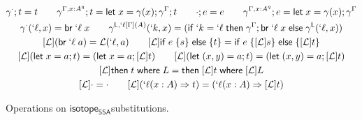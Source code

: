 \documentclass[acmsmall,screen,review]{acmart}
\newcommand{\mc}[1]{\ensuremath{\mathcal{#1}}}
\newcommand{\ms}[1]{\ensuremath{\mathsf{#1}}}
\newcommand{\lbl}[1]{{`#1}}
\newcommand{\lto}{\Rightarrow}
\newcommand{\letstmt}[3]{\ensuremath{\ms{let}\;#1 = #2; #3}}
\newcommand{\brb}[2]{\ms{br}\;#1\;#2}
\newcommand{\lbrb}[2]{\brb{\lbl{#1}}{#2}}
\newcommand{\ite}[3]{\ms{if}\;#1\;\{#2\}\;\ms{else}\;\{#3\}}
\newcommand{\ewhere}[2]{\ms{then}\;#1\;\ms{where}\;#2}
\newcommand{\wbranch}[3]{#1(#2) \lto #3}
\newcommand{\lwbranch}[3]{\wbranch{\lbl{#1}}{#2}{#3}}
\newcommand{\lhyp}[3]{#1[#2](#3)}
\newcommand{\llhyp}[3]{\lhyp{\lbl{#1}}{#2}{#3}}
\newcommand{\exprletsubst}[2]{{#1};{#2}}
\newcommand{\stmtletsubst}[2]{{#1};{#2}}
\newcommand{\substctx}[2]{{#1}^{#2}}
\newcommand{\substlbs}[2]{{#1}^{#2}}
\newcommand{\restrictsubst}[2]{{#1}_{#2}}
\newcommand{\isotopessa}{\ms{isotope_{SSA}}}
\begin{document}
\begin{figure}
  \begin{gather*}
    \stmtletsubst{\substctx{\gamma}{\cdot}}{t} = t
    \qquad
    \stmtletsubst{\substctx{\gamma}{\Gamma, x: A^q}}{t} 
      = \letstmt{x}{\gamma(x)}{\stmtletsubst{\substctx{\gamma}{\Gamma}}{t}}
    \qquad
    \exprletsubst{\cdot}{e} = e
    \qquad
    \exprletsubst{\substctx{\gamma}{\Gamma, x: A^q}}{e} 
      = \letstmt{x}{\gamma(x)}{\substctx{\gamma}{\Gamma}}
    \\
    \substlbs{\gamma}{\cdot}(\lbl{\ell}, x) = \lbrb{\ell}{x}
    \qquad
    \substlbs{\gamma}{\ms{L}, \llhyp{\ell}{\Gamma}{A}}(\lbl{k}, x)
      = 
      (\ms{if}\; \lbl{k} = \lbl{\ell} 
      \;\ms{then}\;\stmtletsubst{\substctx{\gamma}{\Gamma}}{\lbrb{\ell}{x}}
      \;\ms{else}\;\substlbs{\gamma}{\ms{L}}(\lbl{\ell}, x))
    \\
    [\mc{L}](\lbrb{\ell}{a}) = \mc{L}(\lbl{\ell}, a)
    \qquad
    [\mc{L}]\ite{e}{s}{t} = \ite{e}{[\mc{L}]s}{[\mc{L}]t}
    \\
    [\mc{L}](\letstmt{x}{a}{t}) = (\letstmt{x}{a}{[\mc{L}]t})
    \qquad
    [\mc{L}](\letstmt{(x, y)}{a}{t}) = (\letstmt{(x, y)}{a}{[\mc{L}]t})
    \\
    [\mc{L}]\ewhere{t}{L} = \ewhere{[\mc{L}]t}{[\mc{L}]L}
    \\
    [\mc{L}]\cdot = \cdot
    \qquad
    [\mc{L}](\lwbranch{\ell}{x: A}{t})
    = (\lwbranch{\ell}{x: A}{[\mc{L}]t})
  \end{gather*}
  \caption{Operations on \isotopessa substitutions.}
  \label{fig:ssa-subst-ops}
\end{figure}
\end{document}
